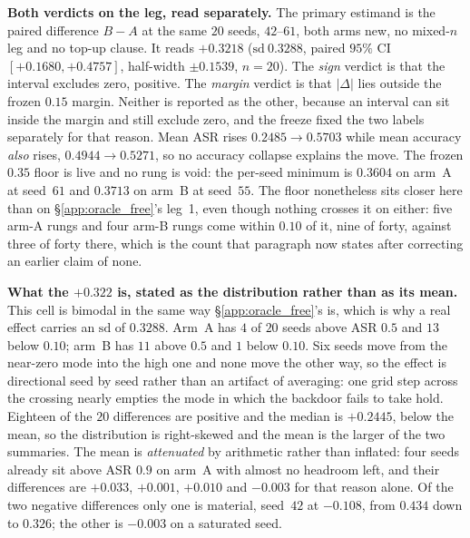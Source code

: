 \documentclass{article}
\begin{document}
\textbf{Both verdicts on the leg, read separately.} The primary estimand is the paired difference $B - A$ at the same $20$ seeds, $42$--$61$, both arms new, no mixed-$n$ leg and no top-up clause. It reads $\mathbf{+0.3218}$ ($\mathrm{sd}\ 0.3288$, paired $95\%$ CI $[+0.1680, +0.4757]$, half-width $\pm0.1539$, $n{=}20$). The \emph{sign} verdict is that the interval excludes zero, positive. The \emph{margin} verdict is that $|\Delta|$ lies outside the frozen $0.15$ margin. Neither is reported as the other, because an interval can sit inside the margin and still exclude zero, and the freeze fixed the two labels separately for that reason. Mean ASR rises $0.2485 \to 0.5703$ while mean accuracy \emph{also} rises, $0.4944 \to 0.5271$, so no accuracy collapse explains the move. The frozen $0.35$ floor is live and no rung is void: the per-seed minimum is $0.3604$ on arm~A at seed~$61$ and $0.3713$ on arm~B at seed~$55$. The floor nonetheless sits closer here than on §\ref{app:oracle_free}'s leg~1, even though nothing crosses it on either: five arm-A rungs and four arm-B rungs come within $0.10$ of it, nine of forty, against three of forty there, which is the count that paragraph now states after correcting an earlier claim of none.

\textbf{What the $+0.322$ is, stated as the distribution rather than as its mean.} This cell is bimodal in the same way §\ref{app:oracle_free}'s is, which is why a real effect carries an $\mathrm{sd}$ of $0.3288$. Arm~A has $4$ of $20$ seeds above ASR $0.5$ and $13$ below $0.10$; arm~B has $11$ above $0.5$ and $1$ below $0.10$. Six seeds move from the near-zero mode into the high one and none move the other way, so the effect is directional seed by seed rather than an artifact of averaging: one grid step across the crossing nearly empties the mode in which the backdoor fails to take hold. Eighteen of the $20$ differences are positive and the median is $+0.2445$, below the mean, so the distribution is right-skewed and the mean is the larger of the two summaries. The mean is \emph{attenuated} by arithmetic rather than inflated: four seeds already sit above ASR $0.9$ on arm~A with almost no headroom left, and their differences are $+0.033$, $+0.001$, $+0.010$ and $-0.003$ for that reason alone. Of the two negative differences only one is material, seed~$42$ at $-0.108$, from $0.434$ down to $0.326$; the other is $-0.003$ on a saturated seed.
\end{document}

